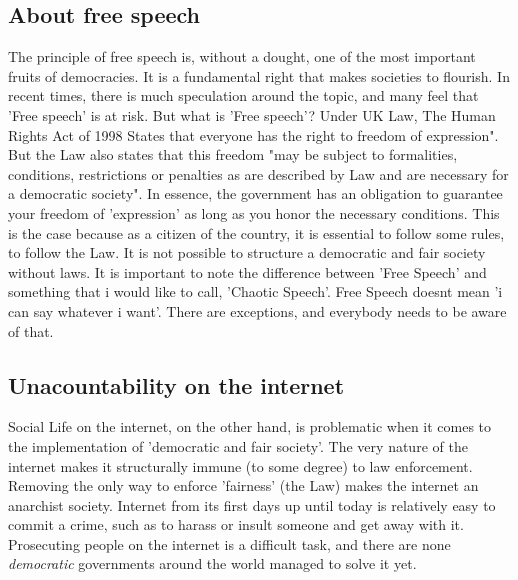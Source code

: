 \documentclass[openany]{article}
\begin{document}
	\subsection*{About free speech}
		The principle of free speech is, without a dought, one of the most important fruits of democracies. It is a fundamental right that 
		makes societies to flourish. In recent times, there is much speculation around the topic, and many feel that 'Free speech' 
		is at risk. But what is 'Free speech'? Under UK Law, The Human Rights Act of 1998\cite{human-rights-act} States that everyone has the right to 
		freedom of expression". But the Law also states that this freedom "may be subject to formalities, conditions, restrictions or penalties 
		as are described by Law and are necessary for a democratic society". In essence, the government has an obligation to guarantee your 
		freedom of 'expression' as long as you honor the necessary conditions. This is the case because as a citizen of the country, it is 
		essential to follow some rules, to follow the Law. It is not possible to structure a democratic and fair society without laws. It is important
		to note the difference between 'Free Speech' and something that i would like to call, 'Chaotic Speech'. Free Speech doesnt mean 'i can say whatever
		i want'. There are exceptions\cite{free-speech-eu,free-speech-uk,free-speech-us}, and everybody needs to be aware of that.
	\subsection*{Unacountability on the internet}
		Social Life on the internet, on the other hand, is problematic when it comes to the implementation of 'democratic and fair society'. 
		The very nature of the internet makes it structurally immune (to some degree) to law enforcement\cite{internet-and-law-enforcement}. 
		Removing the only way to enforce 'fairness' (the Law) makes the internet an anarchist society. Internet from its first days up until 
		today is relatively easy to commit a crime, such as to harass or insult someone and get away with it. Prosecuting 
		people on the internet is a difficult task, and there are none \textit{democratic} governments around the world managed to solve it  yet.
\end{document}
